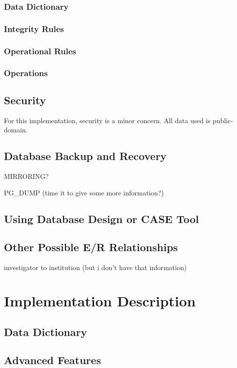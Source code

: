 \documentclass[a4paper,11pt]{article}
\begin{document}
\subsubsection{Data Dictionary}
\subsubsection{Integrity Rules}
\subsubsection{Operational Rules}
\subsubsection{Operations}

\subsection{Security}
For this implementation, security is a minor concern.  All data used is public-domain.

\subsection{Database Backup and Recovery}
MIRRORING?  

PG\_DUMP (time it to give some more information?)

\subsection{Using Database Design or CASE Tool}

\subsection{Other Possible E/R Relationships}

investigator to institution (but i don't have that information)

\section{Implementation Description}

\subsection{Data Dictionary}
\subsection{Advanced Features}
\end{document}
